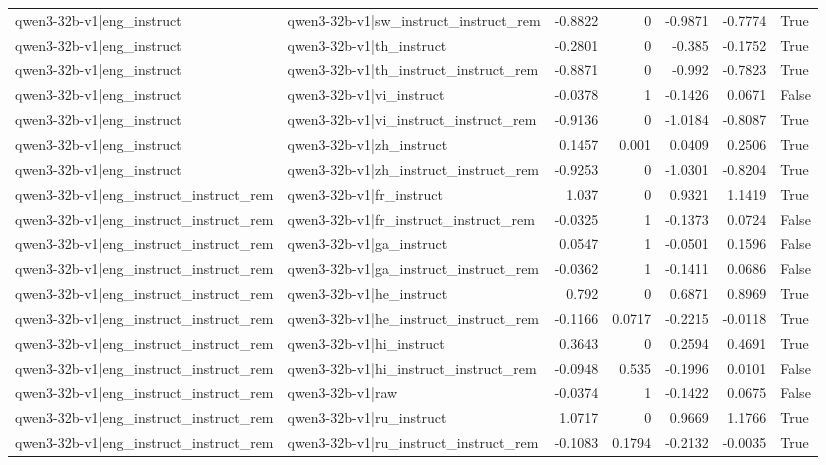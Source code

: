 \begin{table}
\begin{tabular}{l l r r r r l}
qwen3-32b-v1|eng_instruct & qwen3-32b-v1|sw_instruct_instruct_rem & -0.8822 & 0 & -0.9871 & -0.7774 & True \\
qwen3-32b-v1|eng_instruct & qwen3-32b-v1|th_instruct & -0.2801 & 0 & -0.385 & -0.1752 & True \\
qwen3-32b-v1|eng_instruct & qwen3-32b-v1|th_instruct_instruct_rem & -0.8871 & 0 & -0.992 & -0.7823 & True \\
qwen3-32b-v1|eng_instruct & qwen3-32b-v1|vi_instruct & -0.0378 & 1 & -0.1426 & 0.0671 & False \\
qwen3-32b-v1|eng_instruct & qwen3-32b-v1|vi_instruct_instruct_rem & -0.9136 & 0 & -1.0184 & -0.8087 & True \\
qwen3-32b-v1|eng_instruct & qwen3-32b-v1|zh_instruct & 0.1457 & 0.001 & 0.0409 & 0.2506 & True \\
qwen3-32b-v1|eng_instruct & qwen3-32b-v1|zh_instruct_instruct_rem & -0.9253 & 0 & -1.0301 & -0.8204 & True \\
qwen3-32b-v1|eng_instruct_instruct_rem & qwen3-32b-v1|fr_instruct & 1.037 & 0 & 0.9321 & 1.1419 & True \\
qwen3-32b-v1|eng_instruct_instruct_rem & qwen3-32b-v1|fr_instruct_instruct_rem & -0.0325 & 1 & -0.1373 & 0.0724 & False \\
qwen3-32b-v1|eng_instruct_instruct_rem & qwen3-32b-v1|ga_instruct & 0.0547 & 1 & -0.0501 & 0.1596 & False \\
qwen3-32b-v1|eng_instruct_instruct_rem & qwen3-32b-v1|ga_instruct_instruct_rem & -0.0362 & 1 & -0.1411 & 0.0686 & False \\
qwen3-32b-v1|eng_instruct_instruct_rem & qwen3-32b-v1|he_instruct & 0.792 & 0 & 0.6871 & 0.8969 & True \\
qwen3-32b-v1|eng_instruct_instruct_rem & qwen3-32b-v1|he_instruct_instruct_rem & -0.1166 & 0.0717 & -0.2215 & -0.0118 & True \\
qwen3-32b-v1|eng_instruct_instruct_rem & qwen3-32b-v1|hi_instruct & 0.3643 & 0 & 0.2594 & 0.4691 & True \\
qwen3-32b-v1|eng_instruct_instruct_rem & qwen3-32b-v1|hi_instruct_instruct_rem & -0.0948 & 0.535 & -0.1996 & 0.0101 & False \\
qwen3-32b-v1|eng_instruct_instruct_rem & qwen3-32b-v1|raw & -0.0374 & 1 & -0.1422 & 0.0675 & False \\
qwen3-32b-v1|eng_instruct_instruct_rem & qwen3-32b-v1|ru_instruct & 1.0717 & 0 & 0.9669 & 1.1766 & True \\
qwen3-32b-v1|eng_instruct_instruct_rem & qwen3-32b-v1|ru_instruct_instruct_rem & -0.1083 & 0.1794 & -0.2132 & -0.0035 & True \\

\end{tabular}
\end{table}
